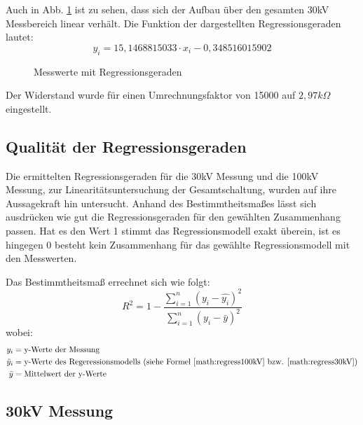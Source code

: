 	
Auch in Abb. \ref{fig:2k97} ist zu sehen, dass sich der Aufbau über den gesamten 30kV Messbereich linear verhält. Die Funktion der dargestellten Regressionsgeraden lautet:
	\begin{equation}
	y_i = 15,1468815033 \cdot x_i - 0,348516015902
	\label{math:regress30kV}
	\end{equation} 
	\begin{figure}[H]
	\caption{Messwerte mit Regressionsgeraden\label{fig:2k97}}
				
		\end{figure}
				Der Widerstand wurde für einen Umrechnungsfaktor von 15000 auf $2,97k\Omega$ eingestellt.
		\begin{figure}[H]
	
	\end{figure}

\subsection{Qualität der Regressionsgeraden}
\begin{figure}[!htbp]
\centering
\end{figure}
Die ermittelten Regressionsgeraden für die 30kV Messung und die 100kV Messung, zur Linearitätsuntersuchung der Gesamtschaltung, wurden auf ihre Aussagekraft hin untersucht. Anhand des Bestimmtheitsmaßes lässt sich ausdrücken wie gut die Regressionsgeraden für den gewählten Zusammenhang passen. Hat es den Wert 1 stimmt das Regressionsmodell exakt überein, ist es hingegen 0 besteht kein Zusammenhang für das gewählte Regressionsmodell mit den Messwerten.

Das Bestimmtheitsmaß errechnet sich wie folgt: 
\begin{equation}
R^{2} = 1 - \frac{\sum \limits_{i=1}^n (y_i - \hat{y_i})^{2}}{\sum \limits_{i=1}^n (y_i - \bar{y})^{2}}
\end{equation}
wobei:
\begin{align*}
y_i &= \text{y-Werte der Messung}\\
\hat{y}_i &= \text{y-Werte des Regeressionsmodells (siehe Formel \ref{math:regress100kV} bzw. \ref{math:regress30kV})}\\
\bar{y} &= \text{Mittelwert der y-Werte}
\end{align*}

\subsection{30kV Messung}

